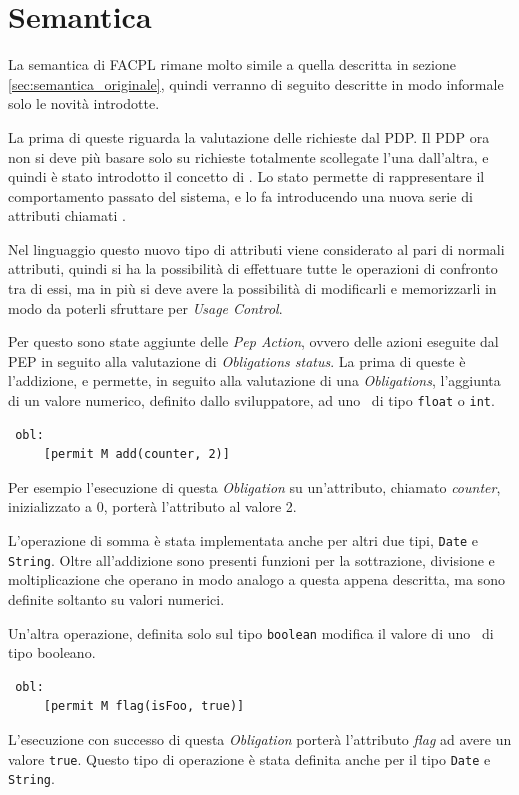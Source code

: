 \section{Semantica} %
\label{sec:semantica}
La semantica di FACPL rimane molto simile a quella descritta in sezione \ref{sec:semantica_originale}, quindi verranno di seguito descritte in modo informale solo le novità introdotte.\\ \par
La prima di queste riguarda la valutazione delle richieste dal PDP. Il PDP ora non si deve più basare solo su richieste totalmente scollegate l'una dall'altra, e quindi è stato introdotto il concetto di \status.
Lo stato permette di rappresentare il comportamento passato del sistema, e lo fa introducendo una nuova serie di attributi chiamati \statusattribute.\\ \par
Nel linguaggio questo nuovo tipo di attributi viene considerato al pari di normali attributi, quindi si ha la possibilità di effettuare tutte le operazioni di confronto tra di essi, ma in più si deve avere la possibilità di modificarli e memorizzarli in modo da poterli sfruttare per \textit{Usage Control}.\\ \par

Per questo sono state aggiunte delle \textit{Pep Action}, ovvero delle azioni eseguite dal PEP in seguito alla valutazione di \textit{Obligations status}. La prima di queste è l'addizione, 
 e permette, in seguito alla valutazione di una \textit{Obligations}, l'aggiunta di un valore numerico, definito dallo sviluppatore, ad uno \statusattribute \ di tipo \texttt{float} o \texttt{int}. 
\begin{verbatim}
 obl:
     [permit M add(counter, 2)]
\end{verbatim}
Per esempio l'esecuzione di questa \textit{Obligation} su un'attributo, chiamato \textit{counter}, inizializzato a $0$, porterà l'attributo al 
valore 2. 

L'operazione di somma è stata implementata anche per altri due tipi, \texttt{Date} e \texttt{String}.
Oltre all'addizione sono presenti funzioni per la sottrazione, divisione e moltiplicazione che operano in modo analogo a questa appena descritta, ma sono definite soltanto su valori numerici.

Un'altra operazione, definita solo sul tipo \texttt{boolean} modifica il valore di uno \statusattribute \ di tipo booleano.
\begin{verbatim}
 obl:
     [permit M flag(isFoo, true)]
\end{verbatim}
L'esecuzione con successo di questa \textit{Obligation} porterà l'attributo \textit{flag} ad avere un valore \texttt{true}. Questo tipo di operazione è stata definita anche per il tipo \texttt{Date} e \texttt{String}.

